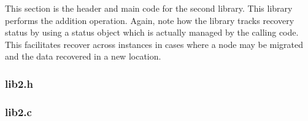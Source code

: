 


This section is the header and main code for the second library. This library 
performs the addition operation. Again, note how the library tracks recovery status by 
using a status object which is actually managed by the calling code. This 
facilitates recover across instances in cases where a node may be migrated and 
the data recovered in a new location.

\subsubsection*{lib2.h}



\subsubsection*{lib2.c}


